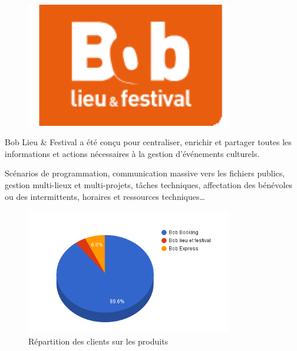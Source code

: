 \vspace{5mm}


\begin{minipage}{0.3\textwidth}
	\begin{figure}[H]
		\centering
		\includegraphics[width=0.8\textwidth]{assets/festival.png}
    \end{figure}
\end{minipage}%
\begin{minipage}{0.6\textwidth}
Bob Lieu \& Festival a été conçu pour centraliser, enrichir et partager toutes les informations et actions nécessaires à la gestion d’événements culturels.

Scénarios de programmation, communication massive vers les fichiers publics, gestion multi-lieux et multi-projets, tâches techniques, affectation des bénévoles ou des intermittents, horaires et ressources techniques…
\end{minipage}

\begin{figure}[h!]
    \centering
    \includegraphics[width=0.8\textwidth]{assets/repartition_client.png}
    \caption{Répartition des clients sur les produits}
    \label{fig:my_label}
\end{figure}

\newpage


